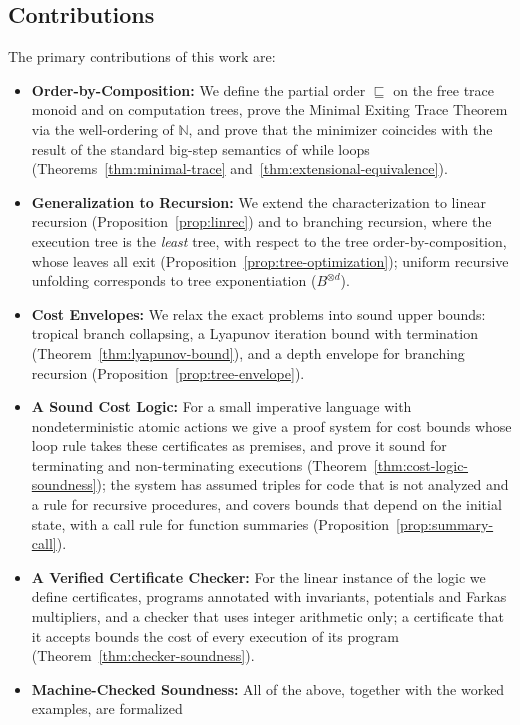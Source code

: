 \documentclass[oneside,english]{amsart}
\numberwithin{equation}{section}
\numberwithin{figure}{section}
\theoremstyle{plain}
\theoremstyle{definition}
\theoremstyle{plain}
\theoremstyle{remark}
\theoremstyle{plain}
\theoremstyle{definition}
\theoremstyle{plain}
\theoremstyle{remark}
\begin{document}
\subsection*{Contributions}
The primary contributions of this work are:
\begin{itemize}
    \item \textbf{Order-by-Composition:} We define the partial order
    $\sqsubseteq$ on the free trace monoid and on computation trees, prove the Minimal Exiting Trace Theorem via
    the well-ordering of $\mathbb{N}$, and prove that the minimizer coincides with the result of the standard
    big-step semantics of while loops (Theorems~\ref{thm:minimal-trace} and~\ref{thm:extensional-equivalence}).
    \item \textbf{Generalization to Recursion:} We extend the characterization to linear recursion
    (Proposition~\ref{prop:linrec}) and to branching recursion, where the execution tree is the \emph{least} tree, with respect to the
    tree order-by-composition, whose leaves all exit (Proposition~\ref{prop:tree-optimization}); uniform recursive
    unfolding corresponds to tree exponentiation ($B^{\otimes d}$).
    \item \textbf{Cost Envelopes:} We relax the exact problems into sound upper bounds: tropical branch collapsing,
    a Lyapunov iteration bound with termination (Theorem~\ref{thm:lyapunov-bound}), and a depth envelope for branching
    recursion (Proposition~\ref{prop:tree-envelope}).
    \item \textbf{A Sound Cost Logic:} For a small imperative language with nondeterministic atomic actions we give a
    proof system for cost bounds whose loop rule takes these certificates as premises, and prove it sound for
    terminating and non-terminating executions (Theorem~\ref{thm:cost-logic-soundness}); the system has assumed
    triples for code that is not analyzed and a rule for recursive procedures, and covers bounds that depend on the
    initial state, with a call rule for function summaries (Proposition~\ref{prop:summary-call}).
    \item \textbf{A Verified Certificate Checker:} For the linear instance of the logic we define certificates,
    programs annotated with invariants, potentials and Farkas multipliers, and a checker that uses integer
    arithmetic only; a certificate that it accepts bounds the cost of every execution of its program
    (Theorem~\ref{thm:checker-soundness}).
    \item \textbf{Machine-Checked Soundness:} All of the above, together with the worked examples, are formalized

\end{itemize}
\end{document}
